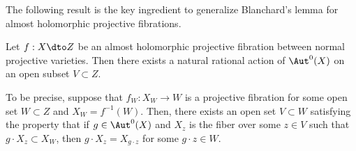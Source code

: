 \documentclass[11pt]{amsart}
\begin{document}
The following result is the key ingredient to generalize Blanchard's lemma for almost holomorphic projective fibrations.

\begin{theorem}\label{theorem: rational action}
    Let $f: X \dto Z$ be an almost holomorphic projective fibration between normal projective varieties. Then there exists a natural rational action of $\Aut^0(X)$ on an open subset $V \subset Z$. 
    
    To be precise, suppose that $f_W: X_W \to W$ is a projective fibration for some open set $W \subset Z$ and $X_W=f^{-1}(W)$. Then, there exists an open set $V \subset W$ satisfying the property that if $g\in \Aut^0(X)$ and $X_z$ is the fiber over some $z\in V$ such that $g \cdot X_z \subset X_W$, then $g \cdot X_z = X_{g \cdot z}$ for some $g\cdot z \in W$.    
\end{theorem}
\end{document}
